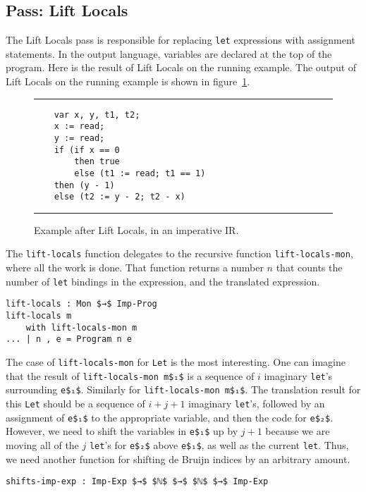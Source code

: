 \documentclass[sigplan,review,dvipsnames,screen,10pt]{acmart}
\begin{document}
\subsection{Pass: Lift Locals}

The Lift Locals pass is responsible for replacing \lstinline{let}
expressions with assignment statements. In the output language,
variables are declared at the top of the program.  Here is the result
of Lift Locals on the running example. The output of Lift Locals on
the running example is shown in
figure~\ref{fig:running-example-structured-imperative}.

\begin{figure}[tp]
  \hrule
\begin{lstlisting}
    var x, y, t1, t2;
    x := read;
    y := read;
    if (if x == 0
        then true
        else (t1 := read; t1 == 1)
    then (y - 1)
    else (t2 := y - 2; t2 - x)
\end{lstlisting}
  \hrule
  \caption{Example after Lift Locals, in an imperative IR.}
  \label{fig:running-example-structured-imperative}
\end{figure}
The \lstinline{lift-locals} function delegates to the recursive
function \lstinline{lift-locals-mon}, where all the work is done.
That function returns a number $n$ that counts the number of
\lstinline{let} bindings in the expression, and the translated
expression.

\begin{lstlisting}
lift-locals : Mon $→$ Imp-Prog
lift-locals m
    with lift-locals-mon m
... | n , e = Program n e    
\end{lstlisting}

\noindent The case of \lstinline{lift-locals-mon} for \lstinline{Let}
is the most interesting. One can imagine that the result of
\lstinline{lift-locals-mon m$₁$} is a sequence of $i$ imaginary
\lstinline{let}'s surrounding \lstinline{e$₁$}. Similarly for 
\lstinline{lift-locals-mon m$₁$}.
The translation result for this \lstinline{Let} should be
a sequence of $i + j + 1$ imaginary
\lstinline{let}'s, followed by an assignment
of \lstinline{e$₁$} to the appropriate variable, and then the
code for \lstinline{e$₂$}. However, we need to shift
the variables in \lstinline{e$₁$} up by $j + 1$ because
we are moving all of the $j$ \lstinline{let}'s for
\lstinline{e$₂$} above \lstinline{e$₁$}, as well as the
current \lstinline{let}. Thus, we need another function
for shifting de Bruijn indices by an arbitrary amount.

\begin{lstlisting}
shifts-imp-exp : Imp-Exp $→$ $ℕ$ $→$ $ℕ$ $→$ Imp-Exp
\end{lstlisting}
\end{document}
